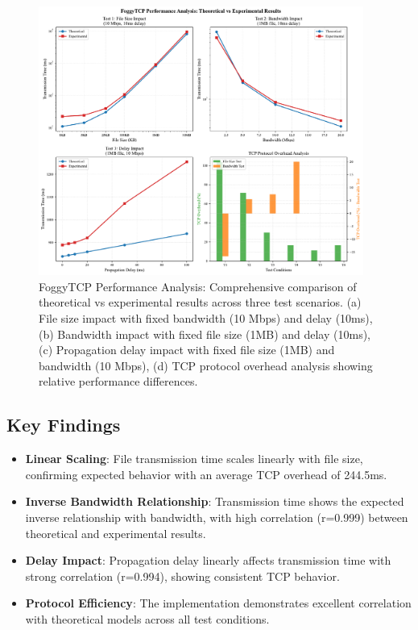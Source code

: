 \documentclass[11pt,letterpaper]{article}
\begin{document}
\begin{figure}[H]
    \centering
    \includegraphics[width=0.95\textwidth]{foggytcp_performance_analysis.pdf}
    \caption{FoggyTCP Performance Analysis: Comprehensive comparison of theoretical vs experimental results across three test scenarios. (a) File size impact with fixed bandwidth (10 Mbps) and delay (10ms), (b) Bandwidth impact with fixed file size (1MB) and delay (10ms), (c) Propagation delay impact with fixed file size (1MB) and bandwidth (10 Mbps), (d) TCP protocol overhead analysis showing relative performance differences.}
    \label{fig:foggytcp_analysis}
\end{figure}

\subsection{Key Findings}

\begin{itemize}
    \item \textbf{Linear Scaling}: File transmission time scales linearly with file size, confirming expected behavior with an average TCP overhead of 244.5ms.
    
    \item \textbf{Inverse Bandwidth Relationship}: Transmission time shows the expected inverse relationship with bandwidth, with high correlation (r=0.999) between theoretical and experimental results.
    
    \item \textbf{Delay Impact}: Propagation delay linearly affects transmission time with strong correlation (r=0.994), showing consistent TCP behavior.
    
    \item \textbf{Protocol Efficiency}: The implementation demonstrates excellent correlation with theoretical models across all test conditions.
\end{itemize}
\end{document}
